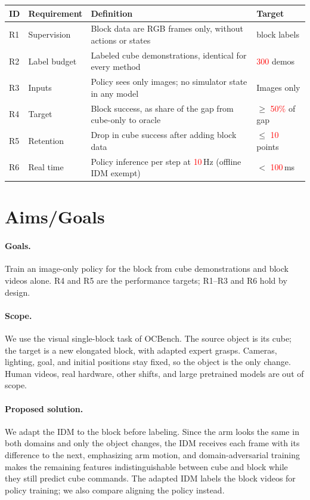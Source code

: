 \documentclass{article}
\newcommand{\tbd}[1]{\textcolor{red}{#1}}
\begin{document}
\begin{center}
\small
\begin{tabular}{@{}l>{\raggedright\arraybackslash}p{2.0cm}>{\raggedright\arraybackslash}p{7.6cm}>{\raggedright\arraybackslash}p{2.3cm}@{}}
\toprule
ID & Requirement & Definition & Target \\
\midrule
R1 & Supervision & Block data are RGB frames only, without actions or states & 0 block labels \\
R2 & Label budget & Labeled cube demonstrations, identical for every method & \tbd{300} demos \\
R3 & Inputs & Policy sees only images; no simulator state in any model & Images only \\
R4 & Target & Block success, as share of the gap from cube-only to oracle & $\geq$ \tbd{50\%} of gap \\
R5 & Retention & Drop in cube success after adding block data & $\leq$ \tbd{10} points \\
R6 & Real time & Policy inference per step at \tbd{10}\,Hz (offline IDM exempt) & $<$ \tbd{100}\,ms \\
\bottomrule
\end{tabular}
\end{center}

\section*{Aims/Goals}
\paragraph{Goals.}
Train an image-only policy for the block from cube demonstrations and block
videos alone. R4 and R5 are the performance targets; R1--R3 and R6 hold by design.

\paragraph{Scope.}
We use the visual single-block task of OCBench. The source object is its cube; the
target is a new elongated block, with adapted expert grasps. Cameras, lighting,
goal, and initial positions stay fixed, so the object is the only change. Human
videos, real hardware, other shifts, and large pretrained models are out of scope.

\paragraph{Proposed solution.}
We adapt the IDM to the block before labeling. Since the arm looks the same in
both domains and only the object changes, the IDM receives each frame with its
difference to the next, emphasizing arm motion, and domain-adversarial training
\citep{ganin2016dann} makes the remaining features indistinguishable between cube
and block while they still predict cube commands. The adapted IDM labels the
block videos for policy training; we also compare aligning the policy instead.
\end{document}
